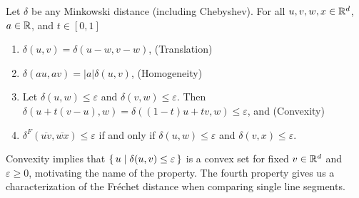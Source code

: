 \begin{lemma}\label{lem:distance_properties}
	Let \(\delta\) be any Minkowski distance (including Chebyshev). For all \(u, v, w, x \in \mathbb{R}^d\), \(a \in \mathbb{R}\), and \(t \in [0, 1]\)
  \begin{enumerate}
		\item \(\delta(u, v) = \delta(u - w, v - w)\), \hfill (Translation)
		\item \(\delta(a u, a v) = |a| \delta(u, v)\), \hfill (Homogeneity)
		\item Let \(\delta(u, w) \leq \varepsilon\) and \(\delta(v, w) \leq \varepsilon\). \newline 
			Then \(\delta(u + t(v-u), w) = \delta((1-t)u + tv, w) \leq \varepsilon\), and \hfill (Convexity)
		\item \(\delta^F(\overline{uv}, \overline{wx}) \leq \varepsilon\) if and only if \(\delta(u, w) \leq \varepsilon\) and \(\delta(v, x) \leq \varepsilon\).
	\end{enumerate}

\end{lemma}

Convexity implies that \(\set{u \mid \delta(u, v) \leq \varepsilon }\) is a convex set for fixed \(v \in \mathbb{R}^d\) and \(\varepsilon \geq 0\), motivating the name of the property. The fourth property gives us a characterization of the Fréchet distance when comparing single line segments. 

